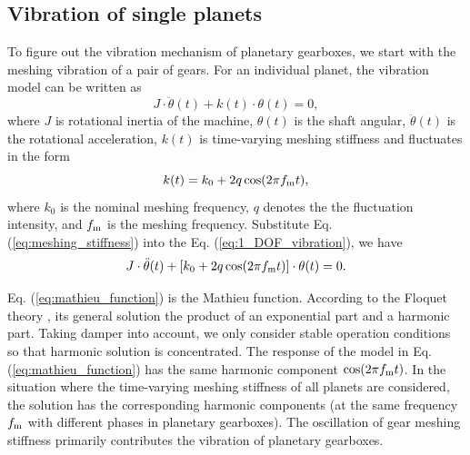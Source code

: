 \documentclass[a4paper]{cas-sc}%
\begin{document}
\subsection{Vibration of single planets}
\par To figure out the vibration mechanism of planetary gearboxes, we start with the meshing vibration of a pair of gears. For an individual planet, the vibration model can be written as
\begin{equation}
    J \cdot \ddot{\theta}(t) + k(t) \cdot \theta(t) = 0 \label{eq:1_DOF_vibration},
\end{equation}
where \(J\) is rotational inertia of the machine, \(\theta(t)\) is the shaft angular, \(\ddot{\theta}(t)\) is the rotational acceleration, \(k(t)\) is time-varying meshing stiffness and fluctuates in the form
\begin{equation}
    k(t)=k_0+2 q \cos(2 \pi f_{\rm m} t) \label{eq:meshing_stiffness},
\end{equation}
where \(k_0\) is the nominal meshing frequency, \(q\) denotes the the fluctuation intensity, and \(f_{\rm m}\) is the meshing frequency. Substitute Eq. (\ref{eq:meshing_stiffness}) into the Eq. (\ref{eq:1_DOF_vibration}), we have
\begin{equation}
    J \cdot \ddot{\theta}(t) + \left[k_0+2 q \cos(2 \pi f_{\rm m} t)\right] \cdot \theta(t) = 0. \label{eq:mathieu_function}
\end{equation}
\par Eq. (\ref{eq:mathieu_function}) is the Mathieu function. According to the Floquet theory \cite{Arscott2014}, its general solution the product of an exponential part and a harmonic part. Taking damper into account, we only consider stable operation conditions so that harmonic solution is concentrated. The response of the model in Eq. (\ref{eq:mathieu_function}) has the same harmonic component \(\cos(2 \pi f_{\rm m} t)\). In the situation where the time-varying meshing stiffness of all planets are considered, the solution has the corresponding harmonic components (at the same frequency \(f_{\rm m}\) with different phases in planetary gearboxes).
The oscillation of gear meshing stiffness primarily contributes the vibration of planetary gearboxes.
\end{document}
